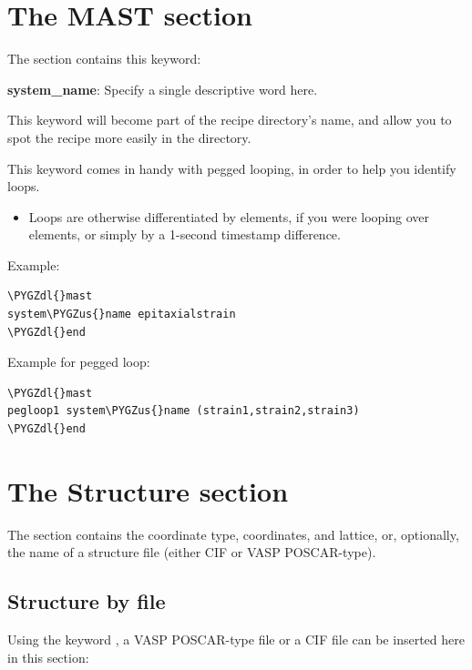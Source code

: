 \documentclass[letterpaper,10pt,english]{sphinxmanual}
\def\PYGZus{\char`\_}
\def\PYGZdl{\char`\$}
\begin{document}
\section{The MAST section}
\label{3_1_0_mast::doc}\label{3_1_0_mast:the-mast-section}
The  section contains this keyword:

\textbf{system\_name}: Specify a single descriptive word here.

This keyword will become part of the recipe directory's name, and allow you to spot the recipe more easily in the  directory.

This keyword comes in handy with pegged looping, in order to help you identify loops.
\begin{itemize}
\item {} 
Loops are otherwise differentiated by elements, if you were looping over elements, or simply by a 1-second timestamp difference.

\end{itemize}

Example:

\begin{Verbatim}[commandchars=\\\{\}]
\PYGZdl{}mast
system\PYGZus{}name epitaxialstrain
\PYGZdl{}end
\end{Verbatim}

Example for pegged loop:

\begin{Verbatim}[commandchars=\\\{\}]
\PYGZdl{}mast
pegloop1 system\PYGZus{}name (strain1,strain2,strain3)
\PYGZdl{}end
\end{Verbatim}


\section{The Structure section}
\label{3_1_1_structure:the-structure-section}\label{3_1_1_structure::doc}
The  section contains the coordinate type, coordinates, and lattice, or, optionally, the name of a structure file (either CIF or VASP POSCAR-type).


\subsection{Structure by file}
\label{3_1_1_structure:structure-by-file}
Using the keyword , a VASP POSCAR-type file or a CIF file can be inserted here in this section:
\end{document}
